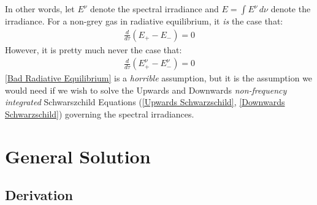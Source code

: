 In other words, let $E^\nu$ denote the spectral irradiance and $E=\int E^\nu\,d\nu$ denote the irradiance. For a non-grey gas in radiative equilibrium, it \textit{is} the case that:
\begin{align*}
    \frac{d}{d\tau}(E_+-E_-)=0
\end{align*}
However, it is pretty much never the case that:
\begin{align}\label{Bad Radiative Equilibrium}
    \frac{d}{d\tau}(E^\nu_{+}-E^\nu_-)=0
\end{align}
\ref{Bad Radiative Equilibrium} is a \textit{horrible} assumption, but it is the assumption we would need if we wish to solve the Upwards and Downwards \textit{non-frequency integrated} Schwarszchild Equations (\ref{Upwards Schwarzschild}, \ref{Downwards Schwarzschild}) governing the spectral irradiances.



\section{General Solution}

\subsection{Derivation}

